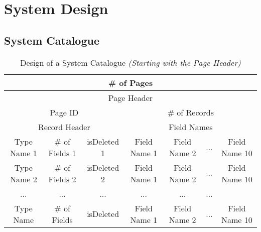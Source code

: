 \documentclass{article}
\begin{document}
\newpage
\section{System Design}
    \subsection{System Catalogue}
               
                \begin{table}[h!]
                \begin{center}
                    \begin{tabular}{ | c | c | c | c | c | c | c | }
                    \hline
                        \multicolumn{7}{||c|}{\# of Pages} \\
                    \hline
                    \hline
                        \multicolumn{7}{||c|}{Page Header} \\
                    \hline
                    \hline
                        \multicolumn{3}{||c|}{Page ID} &
                        \multicolumn{4}{|c||}{\# of Records} \\
                    \hline
                    \hline
                        \multicolumn{3}{||c|}{Record Header} &
                        \multicolumn{4}{|c||}{Field Names} \\
                    \hline
                    \hline
                    Type Name 1 & \# of Fields  1 & isDeleted 1 & Field Name 1  & Field Name 2 & ... & Field Name 10 \\
                    \hline
                    Type Name 2 & \# of Fields 2 & isDeleted 2 & Field Name 1 & Field Name 2 & ... & Field Name 10 \\
                    \hline
                    ... & ... & ... & ... & ... & ... \\
                    \hline
                    Type Name  & \# of Fields & isDeleted & Field Name 1 & Field Name 2 & ... & Field Name 10 \\
                    \hline
                    \end{tabular}
                \end{center}
            \caption{Design of a System Catalogue \emph{(Starting with the Page Header)}}
            \label{table:1}
        \end{table}
\end{document}
